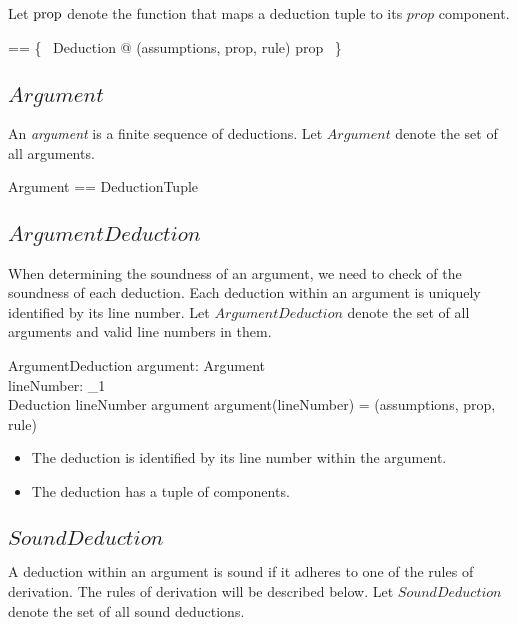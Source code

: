 \documentclass[11pt, oneside]{article}
\begin{document}
Let $\operatorname{prop}$ denote the function that maps a deduction tuple to its $prop$ component.

\begin{zed}
	\deductionProp == \{~ Deduction @ (assumptions, prop, rule) \mapsto prop ~\}
\end{zed}

\subsection{$Argument$}

An {\it argument} is a finite sequence of deductions.
Let $Argument$ denote the set of all arguments.

\begin{zed}
	Argument == \seq DeductionTuple
\end{zed}

\subsection{$ArgumentDeduction$}

When determining the soundness of an argument, we need to check of the soundness of each deduction.
Each deduction within an argument is uniquely identified by its line number.
Let $ArgumentDeduction$ denote the set of all arguments and valid line numbers in them.

\begin{schema}{ArgumentDeduction}
	argument: Argument \\
	lineNumber: \nat_1 \\
	Deduction
\where
	lineNumber \in \dom argument
\also
	argument(lineNumber) = (assumptions, prop, rule)
\end{schema}
\begin{itemize}
	\item The deduction is identified by its line number within the argument.
	\item The deduction has a tuple of components.
\end{itemize}

\subsection{$SoundDeduction$}

A deduction within an argument is sound if it adheres to one of the rules of derivation.
The rules of derivation will be described below.
Let $SoundDeduction$ denote the set of all sound deductions.
\end{document}
